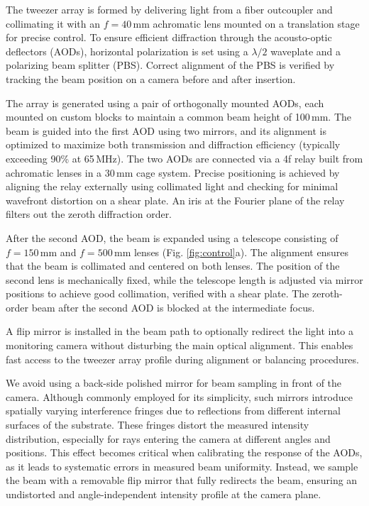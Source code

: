 The tweezer array is formed by delivering light from a fiber outcoupler and collimating it with an $f = 40\,\mathrm{mm}$ achromatic lens mounted on a translation stage for precise control. To ensure efficient diffraction through the acousto-optic deflectors (AODs), horizontal polarization is set using a $\lambda/2$ waveplate and a polarizing beam splitter (PBS). Correct alignment of the PBS is verified by tracking the beam position on a camera before and after insertion.

The array is generated using a pair of orthogonally mounted AODs, each mounted on custom blocks to maintain a common beam height of 100\,mm. The beam is guided into the first AOD using two mirrors, and its alignment is optimized to maximize both transmission and diffraction efficiency (typically exceeding 90\% at 65\,MHz). The two AODs are connected via a 4f relay built from achromatic lenses in a 30\,mm cage system. Precise positioning is achieved by aligning the relay externally using collimated light and checking for minimal wavefront distortion on a shear plate. An iris at the Fourier plane of the relay filters out the zeroth diffraction order.

After the second AOD, the beam is expanded using a telescope consisting of $f = 150\,\mathrm{mm}$ and $f = 500\,\mathrm{mm}$ lenses (Fig. \ref{fig:control}a). The alignment ensures that the beam is collimated and centered on both lenses. The position of the second lens is mechanically fixed, while the telescope length is adjusted via mirror positions to achieve good collimation, verified with a shear plate. The zeroth-order beam after the second AOD is blocked at the intermediate focus.

A flip mirror is installed in the beam path to optionally redirect the light into a monitoring camera without disturbing the main optical alignment. This enables fast access to the tweezer array profile during alignment or balancing procedures.

We avoid using a back-side polished mirror for beam sampling in front of the camera. Although commonly employed for its simplicity, such mirrors introduce  spatially varying interference fringes due to reflections from different internal surfaces of the substrate. These fringes distort the measured intensity distribution, especially for rays entering the camera at different angles and positions. This effect becomes critical when calibrating the response of the AODs, as it leads to systematic errors in measured beam uniformity. Instead, we sample the beam with a removable flip mirror that fully redirects the beam, ensuring an undistorted and angle-independent intensity profile at the camera plane.
